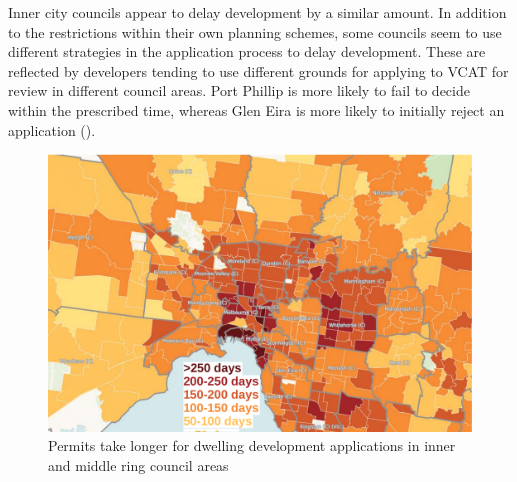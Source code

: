 \begin{boxshell}
\begin{leftfullpage}
\begin{mdframed}[style=GrattanFrameBoxA]
\begin{multicols}{2}
				Inner city councils appear to delay development by a similar amount. In addition to the restrictions within their own planning schemes, some councils seem to use different strategies in the application process to delay development. These are reflected by developers tending to use different grounds for applying to VCAT for review in different council areas.
				Port Phillip is more likely to fail to decide within the prescribed time, whereas Glen Eira is more likely to initially reject an application ().

				\begin{figure}[H]
				\caption{Permits take longer for dwelling development applications in inner and middle ring council areas}\label{fig:Melb_planning_map}
				\includegraphics[page=2]{atlas/Melb_planning_delays_map_short.pdf}
				\end{figure}
			\end{multicols}
		\end{mdframed}
	\end{leftfullpage}
	\end{boxshell}
